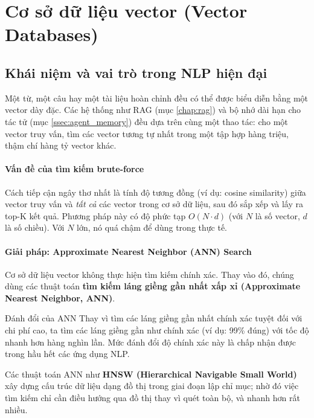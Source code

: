 
\section{Cơ sở dữ liệu vector (Vector Databases)}
\label{sec:vector_databases}

\subsection{Khái niệm và vai trò trong NLP hiện đại}
\label{ssec:vector_db_concepts}

Một từ, một câu hay một tài liệu hoàn chỉnh đều có thể được biểu diễn bằng một vector dày đặc. Các hệ thống như RAG (mục \ref{chap:rag}) và bộ nhớ dài hạn cho tác tử (mục \ref{ssec:agent_memory}) đều dựa trên cùng một thao tác: cho một vector truy vấn, tìm các vector tương tự nhất trong một tập hợp hàng triệu, thậm chí hàng tỷ vector khác.

\paragraph{Vấn đề của tìm kiếm brute-force}
Cách tiếp cận ngây thơ nhất là tính độ tương đồng (ví dụ: cosine similarity) giữa vector truy vấn và \textit{tất cả} các vector trong cơ sở dữ liệu, sau đó sắp xếp và lấy ra top-K kết quả. Phương pháp này có độ phức tạp $O(N \cdot d)$ (với $N$ là số vector, $d$ là số chiều). Với $N$ lớn, nó quá chậm để dùng trong thực tế.

\paragraph{Giải pháp: Approximate Nearest Neighbor (ANN) Search}
Cơ sở dữ liệu vector không thực hiện tìm kiếm chính xác. Thay vào đó, chúng dùng các thuật toán \textbf{tìm kiếm láng giềng gần nhất xấp xỉ (Approximate Nearest Neighbor, ANN)}.
\begin{keyidea}{Đánh đổi của ANN}
Thay vì tìm các láng giềng gần nhất chính xác tuyệt đối với chi phí cao, ta tìm các láng giềng gần như chính xác (ví dụ: 99\% đúng) với tốc độ nhanh hơn hàng nghìn lần. Mức đánh đổi độ chính xác này là chấp nhận được trong hầu hết các ứng dụng NLP.
\end{keyidea}
Các thuật toán ANN như \textbf{HNSW (Hierarchical Navigable Small World)} xây dựng cấu trúc dữ liệu dạng đồ thị trong giai đoạn lập chỉ mục; nhờ đó việc tìm kiếm chỉ cần điều hướng qua đồ thị thay vì quét toàn bộ, và nhanh hơn rất nhiều.

